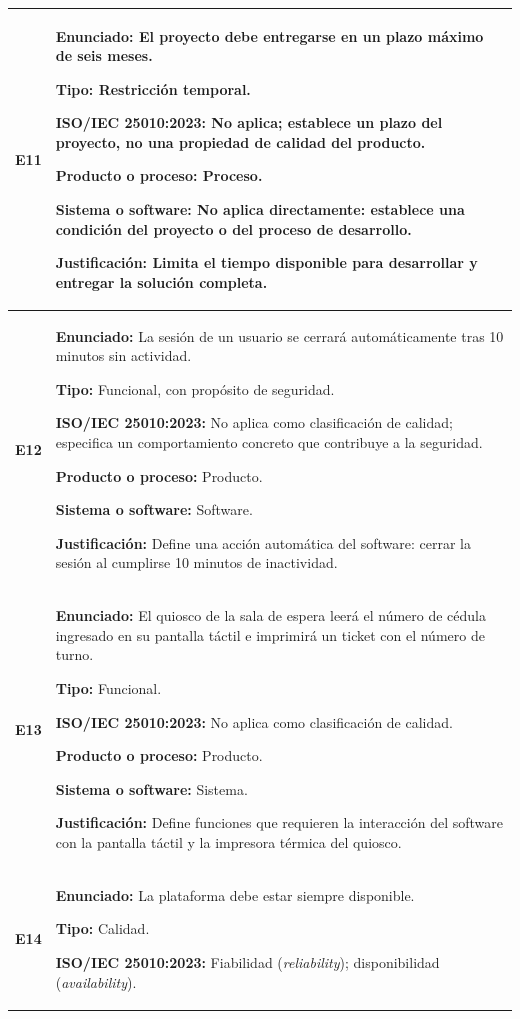 \documentclass[11pt,a4paper]{article}
\begin{document}
\begin{longtable}{|
    p{}|
    p{}|}
\textbf{E11} &
\textbf{Enunciado:}
El proyecto debe entregarse en un plazo
máximo de seis meses.

\textbf{Tipo:} Restricción temporal.

\textbf{ISO/IEC 25010:2023:}
No aplica; establece un plazo del proyecto,
no una propiedad de calidad del producto.

\textbf{Producto o proceso:} Proceso.

\textbf{Sistema o software:}
No aplica directamente: establece una condición
del proyecto o del proceso de desarrollo.

\textbf{Justificación:}
Limita el tiempo disponible para desarrollar
y entregar la solución completa.
\\
\hline

\textbf{E12} &
\textbf{Enunciado:}
La sesión de un usuario se cerrará
automáticamente tras 10 minutos sin actividad.

\textbf{Tipo:}
Funcional, con propósito de seguridad.

\textbf{ISO/IEC 25010:2023:}
No aplica como clasificación de calidad;
especifica un comportamiento concreto
que contribuye a la seguridad.

\textbf{Producto o proceso:} Producto.

\textbf{Sistema o software:} Software.

\textbf{Justificación:}
Define una acción automática del software:
cerrar la sesión al cumplirse 10 minutos
de inactividad.
\\
\hline

\textbf{E13} &
\textbf{Enunciado:}
El quiosco de la sala de espera leerá el número
de cédula ingresado en su pantalla táctil e
imprimirá un ticket con el número de turno.

\textbf{Tipo:} Funcional.

\textbf{ISO/IEC 25010:2023:}
No aplica como clasificación de calidad.

\textbf{Producto o proceso:} Producto.

\textbf{Sistema o software:} Sistema.

\textbf{Justificación:}
Define funciones que requieren la interacción
del software con la pantalla táctil y la
impresora térmica del quiosco.
\\
\hline

\textbf{E14} &
\textbf{Enunciado:}
La plataforma debe estar siempre disponible.

\textbf{Tipo:} Calidad.

\textbf{ISO/IEC 25010:2023:}
Fiabilidad (\textit{reliability});
disponibilidad (\textit{availability}).


\end{longtable}
\end{document}
